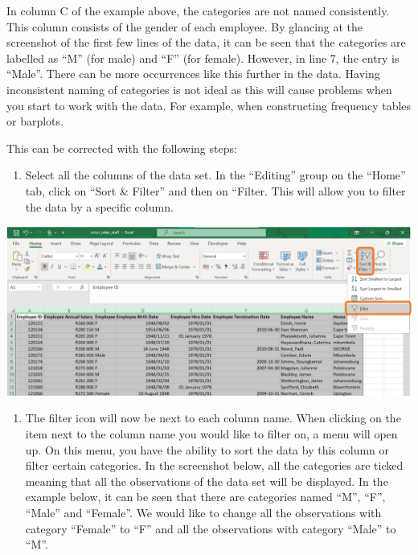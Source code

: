 \documentclass[
]{book}
\providecommand{\tightlist}{%
  \setlength{\itemsep}{0pt}\setlength{\parskip}{0pt}}
\begin{document}
In column C of the example above, the categories are not named consistently. This column consists of the gender of each employee. By glancing at the screenshot of the first few lines of the data, it can be seen that the categories are labelled as ``M'' (for male) and ``F'' (for female). However, in line 7, the entry is ``Male''. There can be more occurrences like this further in the data. Having inconsistent naming of categories is not ideal as this will cause problems when you start to work with the data. For example, when constructing frequency tables or barplots.

This can be corrected with the following steps:

\begin{enumerate}
\def\labelenumi{\arabic{enumi}.}
\tightlist
\item
  Select all the columns of the data set. In the ``Editing'' group on the ``Home'' tab, click on ``Sort \& Filter'' and then on ``Filter. This will allow you to filter the data by a specific column.
\end{enumerate}

\begin{center}\includegraphics[width=0.7\linewidth]{Figures/cleaning_categories_1} \end{center}

\begin{enumerate}
\def\labelenumi{\arabic{enumi}.}
\setcounter{enumi}{1}
\tightlist
\item
  The filter icon will now be next to each column name. When clicking on the item next to the column name you would like to filter on, a menu will open up. On this menu, you have the ability to sort the data by this column or filter certain categories. In the screenshot below, all the categories are ticked meaning that all the observations of the data set will be displayed. In the example below, it can be seen that there are categories named ``M'', ``F'', ``Male'' and ``Female''. We would like to change all the observations with category ``Female'' to ``F'' and all the observations with category ``Male'' to ``M''.
\end{enumerate}
\end{document}
